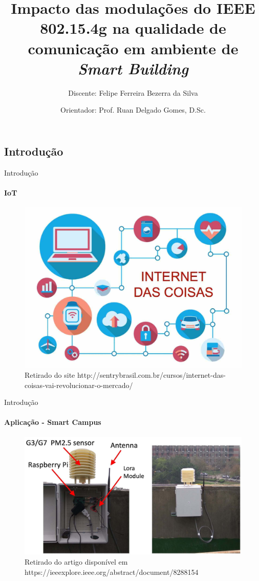 \documentclass[c]{beamer}
\title{Impacto das modulações do {IEEE 802.15.4g} na qualidade de comunicação em ambiente de \textit{Smart Building}}
\subtitle{Discente: Felipe Ferreira Bezerra da Silva}
\author{Orientador: Prof. Ruan Delgado Gomes, D.Sc.}
\begin{document}
\frame[c]{\maketitle}


\begin{darkframes}

  \section{Introdução}
  \begin{frame}{Introdução}
    \framesubtitle{IoT}
    \begin{figure}[ht]
      \centering
      \includegraphics[width=.7\textwidth]{resources/intro_iot.jpg}\\
      \footnotesize{Retirado do site http://sentrybrasil.com.br/cursos/internet-das-coisas-vai-revolucionar-o-mercado/}
    \end{figure}
  \end{frame}

  \begin{frame}{Introdução}
    \framesubtitle{Aplicação - Smart Campus}
    \begin{figure}[ht]
      \centering
      \includegraphics[width=.9\textwidth]{resources/smart-campus-example.png}\\
      \footnotesize{Retirado do artigo disponível em https://ieeexplore.ieee.org/abstract/document/8288154}
    \end{figure}
  \end{frame}


\end{darkframes}
\end{document}
